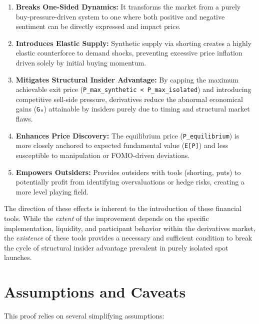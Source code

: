 \documentclass{article}
\begin{document}
\begin{enumerate}
    \item \textbf{Breaks One-Sided Dynamics:} It transforms the market from a purely buy-pressure-driven system to one where both positive and negative sentiment can be directly expressed and impact price.
    \item \textbf{Introduces Elastic Supply:} Synthetic supply via shorting creates a highly elastic counterforce to demand shocks, preventing excessive price inflation driven solely by initial buying momentum.
    \item \textbf{Mitigates Structural Insider Advantage:} By capping the maximum achievable exit price (\lstinline{P_max_synthetic < P_max_isolated}) and introducing competitive sell-side pressure, derivatives reduce the abnormal economical gains (\lstinline{Gₐ}) attainable by insiders purely due to timing and structural market flaws.
    \item \textbf{Enhances Price Discovery:} The equilibrium price (\lstinline{P_equilibrium}) is more closely anchored to expected fundamental value (\lstinline{E[P]}) and less susceptible to manipulation or FOMO-driven deviations.
    \item \textbf{Empowers Outsiders:} Provides outsiders with tools (shorting, puts) to potentially profit from identifying overvaluations or hedge risks, creating a more level playing field.
\end{enumerate}
The direction of these effects is inherent to the introduction of these financial tools. While the \textit{extent} of the improvement depends on the specific implementation, liquidity, and participant behavior within the derivatives market, the \textit{existence} of these tools provides a necessary and sufficient condition to break the cycle of structural insider advantage prevalent in purely isolated spot launches.

\section{Assumptions and Caveats}

This proof relies on several simplifying assumptions:
\end{document}
